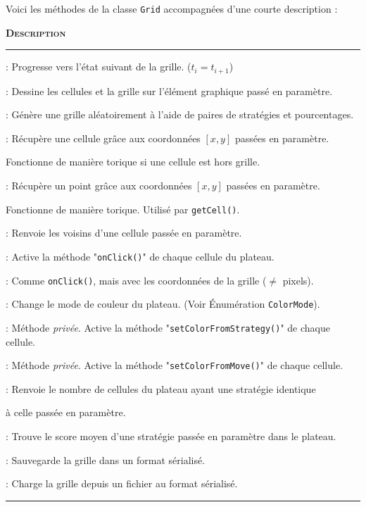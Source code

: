 \documentclass[a4paper]{article}
\begin{document}
Voici les méthodes de la classe \texttt{Grid} accompagnées d'une courte description : 
\vspace{0.25cm}
\begin{description}[labelwidth=4cm]
    \small
    \item[\textbf{\textsc{Méthode}}] \textbf{\textsc{Description}}
    \vspace{0.1cm}
    \hrule{}
    \item[\texttt{step()}] : Progresse vers l'état suivant de la grille. ($t_{i} = t_{i+1}$)
    \item[\texttt{draw()}] :  Dessine les cellules et la grille sur l'élément graphique passé en paramètre.
    \item[\texttt{generate()}] :  Génère une grille aléatoirement à l'aide de paires de stratégies et pourcentages.
    \item[\texttt{getCell()}] : Récupère une cellule grâce aux coordonnées $[x, y]$ passées en paramètre.
    \item[]\hspace{2.5pt} Fonctionne de manière torique si une cellule est hors grille.
    \item[\texttt{getPointClampedInGrid()}] : Récupère un point grâce aux coordonnées $[x, y]$ passées en paramètre.
    \item[]\hspace{2.5pt} Fonctionne de manière torique. Utilisé par \texttt{getCell()}.
    \item[\texttt{findCellNeighbors()}] :  Renvoie les voisins d'une cellule passée en paramètre.
    \item[\texttt{onClick()}] : Active la méthode "\texttt{onClick()}" de chaque cellule du plateau.
    \item[\texttt{setStrategy()}] : Comme \texttt{onClick()}, mais avec les coordonnées de la grille ($\neq$ pixels).
    \item[\texttt{setColorMode()}] :  Change le mode de couleur du plateau. (Voir Énumération \texttt{ColorMode}).
    \item[\texttt{setColorFromStrategy()}] :  Méthode \textit{privée}. Active la méthode "\texttt{setColorFromStrategy()}" de chaque cellule.
    \item[\texttt{setColorFromMove()}] :  Méthode \textit{privée}. Active la méthode "\texttt{setColorFromMove()}" de chaque cellule.
    \item[\texttt{findCountOfStrategy()}] : Renvoie le nombre de cellules du plateau ayant une stratégie identique 
    \item[]\hspace{2.5pt} à celle passée en paramètre.
    \item[\texttt{findAvgScoreOfStrategy()}] :  Trouve le score moyen d'une stratégie passée en paramètre dans le plateau.
    \item[\texttt{saveData()}] : Sauvegarde la grille dans un format sérialisé.
    \item[\texttt{loadData()}] : Charge la grille depuis un fichier au format sérialisé.
\end{description}
\vspace{0.25cm}
\hrule{}
\vspace{0.5cm}
\pagebreak
\end{document}
